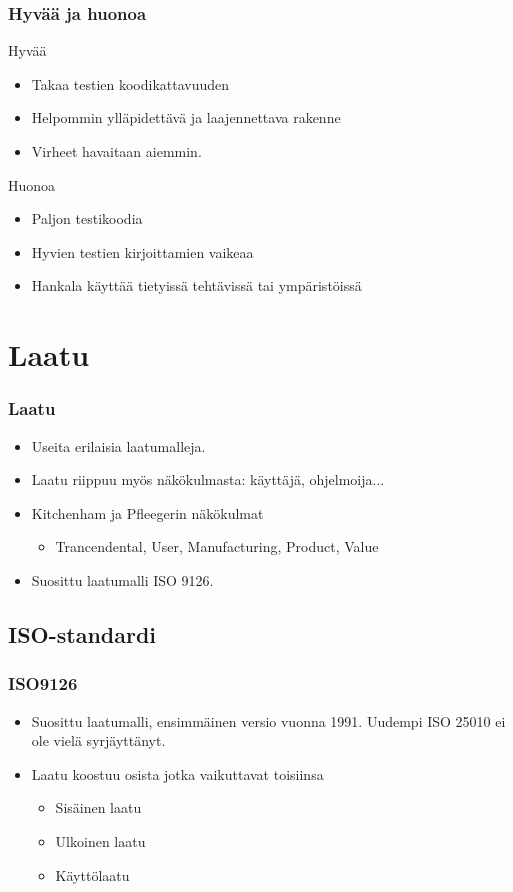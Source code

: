 \documentclass{beamer}
\begin{document}
\begin{frame}
    	\frametitle{Hyvää ja huonoa}
 Hyvää
	\begin{itemize}
	\item Takaa testien koodikattavuuden
	\item Helpommin ylläpidettävä ja laajennettava rakenne
	\item Virheet havaitaan aiemmin.
	\end{itemize}
Huonoa
	\begin{itemize}
	\item Paljon testikoodia
	\item Hyvien testien kirjoittamien vaikeaa
	\item Hankala käyttää tietyissä tehtävissä tai ympäristöissä


	\end{itemize}
\end{frame}



\section{Laatu}
\begin{frame}
    	\frametitle{Laatu}
	\begin{itemize}
	\item Useita erilaisia laatumalleja.
	\item Laatu riippuu myös näkökulmasta: käyttäjä, ohjelmoija...
	\item Kitchenham ja Pfleegerin näkökulmat
		\begin{itemize}
		\item Trancendental, User, Manufacturing, Product, Value
		\end{itemize}
	\item Suosittu laatumalli ISO 9126.
	\end{itemize}
\end{frame}

\subsection{ISO-standardi}
\begin{frame}
    	\frametitle{ISO9126}
	\begin{itemize}
	\item Suosittu laatumalli, ensimmäinen versio vuonna 1991. Uudempi ISO 25010 ei ole vielä syrjäyttänyt.
	\item Laatu koostuu osista jotka vaikuttavat toisiinsa
		\begin{itemize}
		\item Sisäinen laatu
		\item Ulkoinen laatu
		\item Käyttölaatu
		\end{itemize}
	\end{itemize}

\end{frame}
\end{document}
